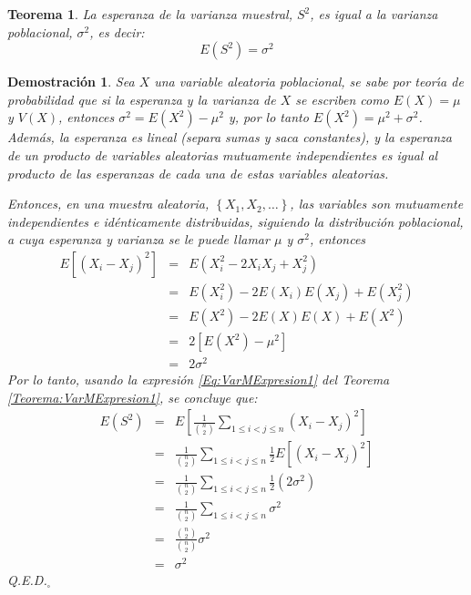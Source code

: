 \documentclass[a4paper,11pt]{article}
\theoremstyle{teoremas}
\newtheorem{teorema}{Teorema}[section]
\theoremstyle{ejemplos}
\theoremstyle{definiciones}
\theoremstyle{lemas}
\newtheorem*{demostracion}{Demostraci\'on}
\begin{document}
\begin{teorema} \label{Teorema:VarMEsperanza}
 La esperanza de la varianza muestral, $S^2$, es igual a la varianza poblacional, $\sigma^2$, es decir:
 \begin{equation}
  E\left( S^2 \right) = \sigma^2
 \end{equation}
\end{teorema}

\begin{demostracion}
 Sea $X$ una variable aleatoria poblacional, se sabe por teor\'{\i}a de probabilidad que si la esperanza y la varianza de $X$ se escriben como $E(X) = \mu$ y $V(X)$, entonces $\sigma^2 = E\left( X^2 \right) - \mu^2$ y, por lo tanto $E\left( X^2 \right) = \mu^2 + \sigma^2$. Adem\'as, la esperanza es lineal (separa sumas y saca constantes), y la esperanza de un producto de variables aleatorias mutuamente independientes es igual al producto de las esperanzas de cada una de estas variables aleatorias.
 \par 
 Entonces, en una muestra aleatoria, $\left\{ X_1, X_2, \ldots \right\}$, las variables son mutuamente independientes e id\'enticamente distribuidas, siguiendo la distribuci\'on poblacional, a cuya esperanza y varianza se le puede llamar $\mu$ y $\sigma^2$, entonces 
 \begin{eqnarray*}
  E\left[ \left( X_i - X_j \right)^2 \right] & = & E\left( X_i^2 - 2X_iX_j + X_j^2 \right) \\
    & = & E\left( X_i^2 \right) - 2E\left( X_i \right)E\left( X_j \right) + E\left( X_j^2 \right) \\ 
    & = & E\left( X^2 \right) - 2E(X)E(X) + E\left( X^2 \right) \\
    & = & 2\left[ E\left( X^2 \right) -\mu^2 \right] \\
    & = & 2\sigma^2
 \end{eqnarray*}
 Por lo tanto, usando la expresi\'on \ref{Eq:VarMExpresion1} del Teorema \ref{Teorema:VarMExpresion1}, se concluye que:
 \begin{eqnarray*}
  E\left( S^2 \right) & = & E\left[ \frac{1}{\binom{n}{2}} \sum_{1\leq i < j \leq n} \left( X_i - X_j \right)^2 \right] \\ 
    & = & \frac{1}{\binom{n}{2}} \sum_{1 \leq i < j \leq n} \frac{1}{2} E\left[ \left( X_i - X_j \right)^2 \right] \\ 
    & = & \frac{1}{\binom{n}{2}} \sum_{1 \leq i < j \leq n} \frac{1}{2} \left( 2\sigma^2 \right) \\ 
    & = & \frac{1}{\binom{n}{2}} \sum_{1 \leq i < j \leq n} \sigma^2 \\ 
    & = & \frac{\binom{n}{2}}{\binom{n}{2}} \sigma^2 \\ 
    & = & \sigma^2
 \end{eqnarray*}
 Q.E.D.${}_{\square}$
\end{demostracion}
\end{document}
